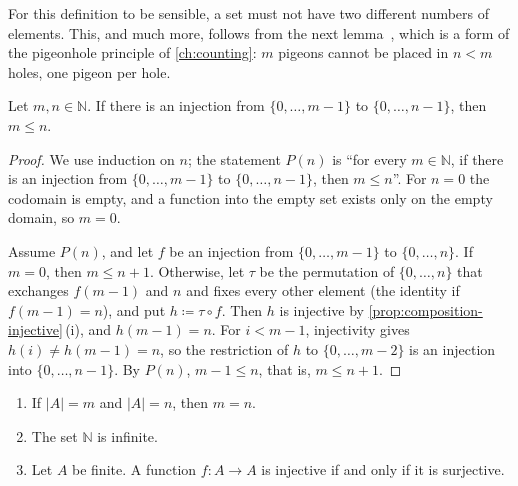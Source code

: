 For this definition to be sensible, a set must not have two different numbers of elements. This, and much more, follows from the next lemma~\cite{hrbacek1999}, which is a form of the pigeonhole principle of \cref{ch:counting}: $m$ pigeons cannot be placed in $n<m$ holes, one pigeon per hole.

\begin{lemma}
\label{lem:pigeonhole}
Let $m,n\in\mathbb N$. If there is an injection from $\{0,\ldots,m-1\}$ to $\{0,\ldots,n-1\}$, then $m\le n$.
\end{lemma}

\begin{proof}
We use induction on $n$; the statement $P(n)$ is ``for every $m\in\mathbb N$, if there is an injection from $\{0,\ldots,m-1\}$ to $\{0,\ldots,n-1\}$, then $m\le n$''. For $n=0$ the codomain is empty, and a function into the empty set exists only on the empty domain, so $m=0$.

Assume $P(n)$, and let $f$ be an injection from $\{0,\ldots,m-1\}$ to $\{0,\ldots,n\}$. If $m=0$, then $m\le n+1$. Otherwise, let $\tau$ be the permutation of $\{0,\ldots,n\}$ that exchanges $f(m-1)$ and $n$ and fixes every other element (the identity if $f(m-1)=n$), and put $h\coloneqq\tau\circ f$. Then $h$ is injective by \cref{prop:composition-injective}\,(i), and $h(m-1)=n$. For $i<m-1$, injectivity gives $h(i)\ne h(m-1)=n$, so the restriction of $h$ to $\{0,\ldots,m-2\}$ is an injection into $\{0,\ldots,n-1\}$. By $P(n)$, $m-1\le n$, that is, $m\le n+1$.
\end{proof}

\begin{corollary}
\label{cor:finite}
\leavevmode
\begin{enumerate}
\item If $|A|=m$ and $|A|=n$, then $m=n$.
\item The set $\mathbb N$ is infinite.
\item Let $A$ be finite. A function $f\colon A\to A$ is injective if and only if it is surjective.
\end{enumerate}
\end{corollary}

